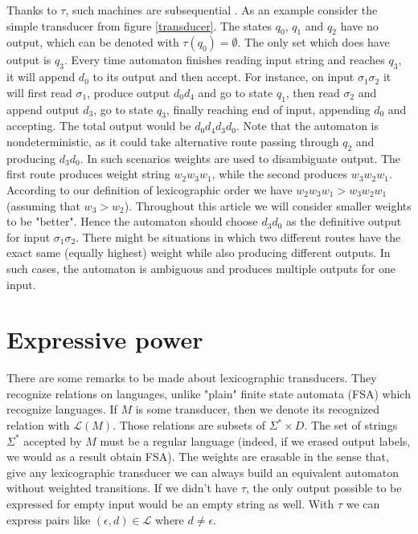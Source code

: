 \documentclass[journal]{journal}
\begin{document}
Thanks to $\tau$, such machines are subsequential \cite{MOHRI}\cite{MOHRI2}\cite{HANSAN}\cite{de_la_higuera}. As an example consider the simple transducer from figure \ref{transducer}. The states $q_0$, $q_1$ and $q_2$ have no output, which can be denoted with $\tau(q_0)=\emptyset$. The only set which does have output is $q_3$. Every time automaton finishes reading input string and reaches $q_3$, it will append $d_0$ to its output and then accept. For instance, on input $\sigma_1\sigma_2$ it will first read $\sigma_1$, produce output $d_0d_4$ and go to state $q_1$, then read $\sigma_2$ and append output $d_3$, go to state $q_3$, finally reaching end of input, appending $d_0$ and accepting. The total output would be $d_0d_4d_3d_0$. Note that the automaton is nondeterministic, as it could take alternative route passing through $q_2$ and producing $d_3d_0$. In such scenarios weights are used to disambiguate output. The first route produces weight string $w_2w_3w_1$, while the second produces $w_3w_2w_1$. According to our definition of lexicographic order we have $w_2w_3w_1 > w_3w_2w_1$ (assuming that $w_3>w_2$). Throughout this article we will consider smaller weights to be "better". Hence the automaton should choose $d_3d_0$ as the definitive output for input $\sigma_1\sigma_2$. There might be situations in which two different routes have the exact same (equally highest) weight while also producing different outputs. In such cases, the automaton is ambiguous and produces multiple outputs for one input.



\section{Expressive power}

There are some remarks to be made about lexicographic transducers.  They recognize relations on languages, unlike "plain" finite state automata (FSA) which recognize languages. If $M$ is some transducer, then we denote its recognized relation with $\mathcal{L}(M)$. Those relations are subsets of $\Sigma^*\times D$. The set of strings $\Sigma^*$ accepted by $M$ must be a regular language (indeed, if we erased output labels, we would as a result obtain FSA). The weights are erasable \cite{MendozaDrosik2020MultitapeAA}  in the sense that, give any lexicographic transducer we can always build an equivalent automaton without weighted transitions. If we didn't have $\tau$, the only output possible to be expressed for empty input would be an empty string as well. With $\tau$ we can express pairs like $(\epsilon,d)\in\mathcal{L}$ where $d\ne\epsilon$.  
\end{document}
